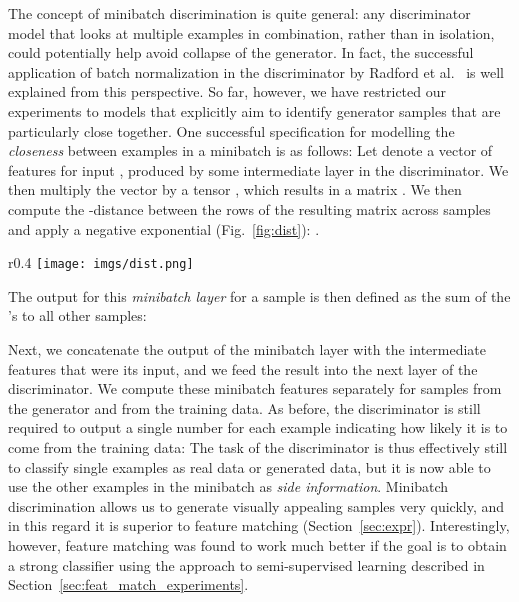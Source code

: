 \documentclass{article} \usepackage{nips14submit_e,times}
\newcommand{\fig}[1]{Fig.~\ref{fig:#1}}
\newcommand{\secc}[1]{Section~\ref{sec:#1}}
\begin{document}
The concept of minibatch discrimination is quite general: any discriminator model that looks at multiple examples in combination, rather than in isolation, could potentially help avoid collapse of the generator. In fact, the successful application of batch normalization in the discriminator by Radford et al.~\cite{radford2015unsupervised} is well explained from this perspective. So far, however,  we have restricted our experiments to models that explicitly aim to identify generator samples that are particularly close together. One successful specification for modelling the \emph{closeness} between examples in a minibatch is as follows: Let  denote a vector of features for input , produced by some intermediate layer in the discriminator. We then multiply the vector  by a tensor , which results in a matrix . We then compute the -distance between the rows of the resulting matrix  across samples  and apply a negative exponential (\fig{dist}): .
\begin{wrapfigure}[13]{r}{0.4\textwidth}
	\centering
	\texttt{[image: imgs/dist.png]}
	\caption{Figure sketches how minibatch discrimination works. Features  from sample  are multiplied
    through a tensor , and cross-sample distance is computed.}
\label{fig:dist}
\end{wrapfigure}
The output  for this \emph{minibatch layer} for a sample  is then defined as the sum of the 's to all other samples:


Next, we concatenate the output  of the minibatch layer with the intermediate features  that were its input, and we feed the result into the next layer of the discriminator. We compute these minibatch features separately for samples from the generator and from the training data. As before, the discriminator is still required to output a single number for each example indicating how likely it is to come from the training data: The task of the discriminator is thus effectively still to classify single examples as real data or generated data, but it is now able to use the other examples in the minibatch as \emph{side information}. Minibatch discrimination allows us to generate visually appealing samples very quickly, and in this regard it is superior to feature matching (\secc{expr}). Interestingly, however, feature matching was found to work much better if the goal is to obtain a strong classifier using the approach to semi-supervised learning described in \secc{feat_match_experiments}.
\end{document}
